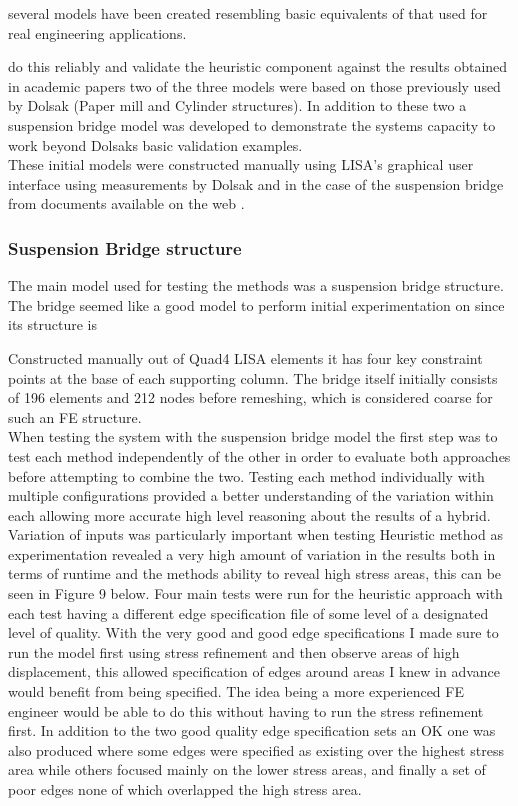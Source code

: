 several models have been created resembling basic equivalents of that used for real engineering applications.

do this reliably and validate the heuristic component against the results obtained in academic papers two of the three models were based on those previously used by Dolsak (Paper mill and Cylinder structures). In addition to these two a suspension bridge model was developed to demonstrate the systems capacity to work beyond Dolsaks basic validation examples. \\ 

\noindent
These initial models were constructed manually using LISA's graphical user interface using measurements by Dolsak and in the case of the suspension bridge from documents available on the web \cite{DolsakPaper91} \cite{SuspensionBridgeMeasurements}.

\subsubsection{Suspension Bridge structure}

The main model used for testing the methods was a suspension bridge structure. The bridge seemed like a good model to perform initial experimentation on since its structure is 


Constructed manually out of Quad4 LISA elements it has four key constraint points at the base of each supporting column. The bridge itself initially consists of 196 elements and 212 nodes before remeshing, which is considered coarse for such an FE structure. \\


\noindent
When testing the system with the suspension bridge model the first step was to test each method independently of the other in order to evaluate both approaches before attempting to combine the two. Testing each method individually with multiple configurations provided a better understanding of the variation within each allowing more accurate high level reasoning about the results of a hybrid. \\

\noindent
Variation of inputs was particularly important when testing Heuristic method as experimentation revealed a very high amount of variation in the results both in terms of runtime and the methods ability to reveal high stress areas, this can be seen in Figure 9 below. Four main tests were run for the heuristic approach with each test having a different edge specification file of some level of a designated level of quality. With the very good and good edge specifications I made sure to run the model first using stress refinement and then observe areas of high displacement, this allowed specification of edges around areas I knew in advance would benefit from being specified. The idea being a more experienced FE engineer would be able to do this without having to run the stress refinement first. In addition to the two good quality edge specification sets an OK one was also produced where some edges were specified as existing over the highest stress area while others focused mainly on the lower stress areas, and finally a set of poor edges none of which overlapped the high stress area. \\


